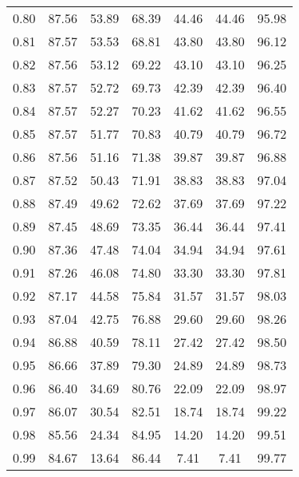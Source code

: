 \begin{tabular}{|c|c|c|c|c|c|c|}
      0.80 &     87.56 &     53.89 &      68.39 &   44.46 &      44.46 &         95.98 \\
      0.81 &     87.57 &     53.53 &      68.81 &   43.80 &      43.80 &         96.12 \\
      0.82 &     87.56 &     53.12 &      69.22 &   43.10 &      43.10 &         96.25 \\
      0.83 &     87.57 &     52.72 &      69.73 &   42.39 &      42.39 &         96.40 \\
      0.84 &     87.57 &     52.27 &      70.23 &   41.62 &      41.62 &         96.55 \\
      0.85 &     87.57 &     51.77 &      70.83 &   40.79 &      40.79 &         96.72 \\
      0.86 &     87.56 &     51.16 &      71.38 &   39.87 &      39.87 &         96.88 \\
      0.87 &     87.52 &     50.43 &      71.91 &   38.83 &      38.83 &         97.04 \\
      0.88 &     87.49 &     49.62 &      72.62 &   37.69 &      37.69 &         97.22 \\
      0.89 &     87.45 &     48.69 &      73.35 &   36.44 &      36.44 &         97.41 \\
      0.90 &     87.36 &     47.48 &      74.04 &   34.94 &      34.94 &         97.61 \\
      0.91 &     87.26 &     46.08 &      74.80 &   33.30 &      33.30 &         97.81 \\
      0.92 &     87.17 &     44.58 &      75.84 &   31.57 &      31.57 &         98.03 \\
      0.93 &     87.04 &     42.75 &      76.88 &   29.60 &      29.60 &         98.26 \\
      0.94 &     86.88 &     40.59 &      78.11 &   27.42 &      27.42 &         98.50 \\
      0.95 &     86.66 &     37.89 &      79.30 &   24.89 &      24.89 &         98.73 \\
      0.96 &     86.40 &     34.69 &      80.76 &   22.09 &      22.09 &         98.97 \\
      0.97 &     86.07 &     30.54 &      82.51 &   18.74 &      18.74 &         99.22 \\
      0.98 &     85.56 &     24.34 &      84.95 &   14.20 &      14.20 &         99.51 \\
      0.99 &     84.67 &     13.64 &      86.44 &    7.41 &       7.41 &         99.77 \\
\bottomrule
\end{tabular}
